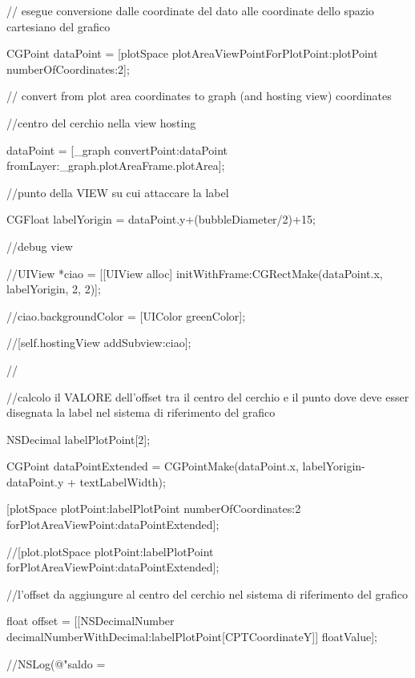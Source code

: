     

    // esegue conversione dalle coordinate del dato alle coordinate dello spazio cartesiano del grafico

    CGPoint dataPoint = [plotSpace plotAreaViewPointForPlotPoint:plotPoint numberOfCoordinates:2];

    

    // convert from plot area coordinates to graph (and hosting view) coordinates

    //centro del cerchio nella view hosting

    dataPoint = [_graph convertPoint:dataPoint fromLayer:_graph.plotAreaFrame.plotArea];

    

    

    //punto della VIEW su cui attaccare la label

    CGFloat labelYorigin = dataPoint.y+(bubbleDiameter/2)+15;

    

    //debug view

    //UIView *ciao = [[UIView alloc] initWithFrame:CGRectMake(dataPoint.x, labelYorigin, 2, 2)];

    //ciao.backgroundColor = [UIColor greenColor];

    //[self.hostingView addSubview:ciao];

    //

    

    //calcolo il VALORE dell'offset tra il centro del cerchio e il punto dove deve esser disegnata la label nel sistema di riferimento del grafico

    NSDecimal labelPlotPoint[2];

    CGPoint dataPointExtended = CGPointMake(dataPoint.x, labelYorigin-dataPoint.y + textLabelWidth);

    [plotSpace plotPoint:labelPlotPoint numberOfCoordinates:2 forPlotAreaViewPoint:dataPointExtended];

    //[plot.plotSpace plotPoint:labelPlotPoint forPlotAreaViewPoint:dataPointExtended];

    

    //l'offset da aggiungure al centro del cerchio nel sistema di riferimento del grafico

    float offset = [[NSDecimalNumber decimalNumberWithDecimal:labelPlotPoint[CPTCoordinateY]] floatValue];

    

    //NSLog(@"\n saldo = %


